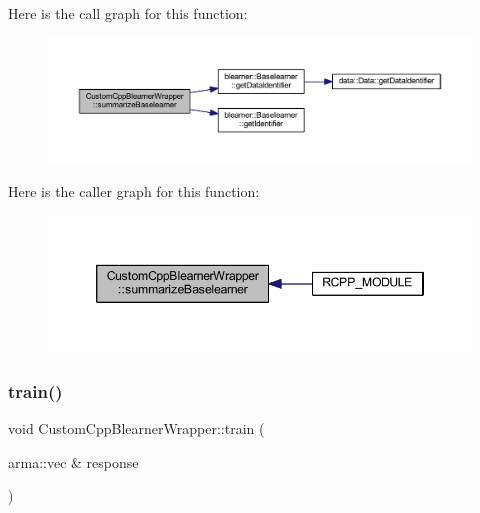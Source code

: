 Here is the call graph for this function\+:\nopagebreak
\begin{figure}[H]
\begin{center}
\leavevmode
\includegraphics[width=350pt]{class_custom_cpp_blearner_wrapper_a832effb3868e124cb149fd06e6033304_cgraph}
\end{center}
\end{figure}
Here is the caller graph for this function\+:\nopagebreak
\begin{figure}[H]
\begin{center}
\leavevmode
\includegraphics[width=346pt]{class_custom_cpp_blearner_wrapper_a832effb3868e124cb149fd06e6033304_icgraph}
\end{center}
\end{figure}
\mbox{\label{class_custom_cpp_blearner_wrapper_a84d08ce4754955b5d6ee2e4a66b5b6bc}} 
\subsubsection{\texorpdfstring{train()}{train()}}
{\footnotesize\ttfamily void Custom\+Cpp\+Blearner\+Wrapper\+::train (\begin{DoxyParamCaption}\item[{arma\+::vec \&}]{response }\end{DoxyParamCaption})\hspace{0.3cm}{\ttfamily [inline]}}

